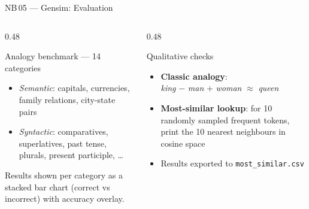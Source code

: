 \documentclass[11pt,aspectratio=169,professionalfonts]{beamer}
\begin{document}
\begin{frame}{NB\,05 — Gensim: Evaluation}

  \begin{columns}[T]
    \begin{column}{0.48\textwidth}
      \begin{block}{Analogy benchmark — 14 categories}
        \begin{itemize}
          \item \textit{Semantic}: capitals, currencies,
                family relations, city-state pairs
          \item \textit{Syntactic}: comparatives,
                superlatives, past tense, plurals,
                present participle, \ldots
        \end{itemize}
        Results shown per category as a stacked bar chart
        (correct vs incorrect) with accuracy overlay.
      \end{block}
    \end{column}
    \begin{column}{0.48\textwidth}
      \begin{block}{Qualitative checks}
        \begin{itemize}
          \item \textbf{Classic analogy}: \\
                \textit{king} $-$ \textit{man}
                $+$ \textit{woman} $\approx$ \textit{queen}
          \item \textbf{Most-similar lookup}: for 10
                randomly sampled frequent tokens, print
                the 10 nearest neighbours in cosine space
          \item Results exported to
                \texttt{most\_similar.csv}
        \end{itemize}
      \end{block}
    \end{column}
  \end{columns}

\end{frame}
%
%
\end{document}
